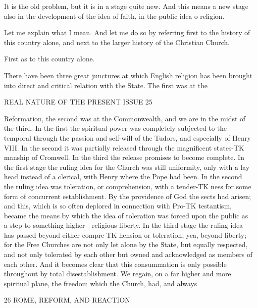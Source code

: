 \documentclass[12pt,a5paper,oneside]{book}
\begin{document}
It is the old problem, but it is in a stage quite 
new. And this means a new stage also in the 
development of the idea of faith, in the public idea o 
religion. 

Let me explain what I mean. And let me do so 
by referring first to the history of this country alone, 
and next to the larger history of the Christian 
Church. 

First as to this country alone. 

There have been three great junctures at which 
English religion has been brought into direct and 
critical relation with the State. The first was at the 



REAL NATURE OF THE PRESENT ISSUE 25 

Reformation, the second was at the Commonwealth, 
and we are in the midst of the third. In the first 
the spiritual power was completely subjected to the 
temporal through the passion and self-will of the 
Tudors, and especially of Henry VIII. In the second 
it was partially released through the magnificent states-TK
manship of Cromwell. In the third the release 
promises to become complete. In the first stage the 
ruling idea for the Church was still uniformity, only 
with a lay head instead of a clerical, with Henry 
where the Pope had been. In the second the ruling 
idea was toleration, or comprehension, with a tender-TK
ness for some form of concurrent establishment. By 
the providence of God the sects had arisen; and this, 
which is so often deplored in connection with Pro-TK
testantism, became the means by which the idea of 
toleration was forced upon the public as a step to 
something higher---religious liberty. In the third 
stage the ruling idea has passed beyond either compre-TK
hension or toleration, yea, beyond liberty; for the Free 
Churches are not only let alone by the State, but 
equally respected, and not only tolerated by each other 
but owned and acknowledged as members of each 
other. And it becomes clear that this consummation 
is only possible throughout by total disestablishment. 
We regain, on a far higher and more spiritual plane, 
the freedom which the Church, had, and always 



26 ROME, REFORM, AND REACTION 
\end{document}
